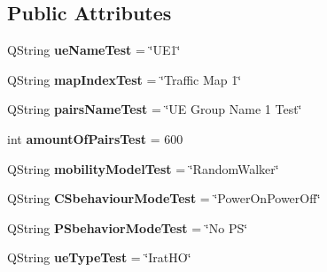 \subsection*{Public Attributes}
\begin{DoxyCompactItemize}
\item 
Q\+String {\bfseries ue\+Name\+Test} = \char`\"{}U\+E1\char`\"{}\hypertarget{class_u_egroup_data___test_ac276af52c4a08459dc2b8c28e0e79672}{}\label{class_u_egroup_data___test_ac276af52c4a08459dc2b8c28e0e79672}

\item 
Q\+String {\bfseries map\+Index\+Test} = \char`\"{}Traffic Map 1\char`\"{}\hypertarget{class_u_egroup_data___test_acc29f4359d9554b43cd0bce6b0a38901}{}\label{class_u_egroup_data___test_acc29f4359d9554b43cd0bce6b0a38901}

\item 
Q\+String {\bfseries pairs\+Name\+Test} = \char`\"{}UE Group Name 1 Test\char`\"{}\hypertarget{class_u_egroup_data___test_a37b1cd389126c5254b4b9e699be8ca86}{}\label{class_u_egroup_data___test_a37b1cd389126c5254b4b9e699be8ca86}

\item 
int {\bfseries amount\+Of\+Pairs\+Test} = 600\hypertarget{class_u_egroup_data___test_a21361becc56b09b177c8cf5ff15b7173}{}\label{class_u_egroup_data___test_a21361becc56b09b177c8cf5ff15b7173}

\item 
Q\+String {\bfseries mobility\+Model\+Test} = \char`\"{}Random\+Walker\char`\"{}\hypertarget{class_u_egroup_data___test_aaae3fba963929853c94c834fda1e390a}{}\label{class_u_egroup_data___test_aaae3fba963929853c94c834fda1e390a}

\item 
Q\+String {\bfseries C\+Sbehaviour\+Mode\+Test} = \char`\"{}Power\+On\+Power\+Off\char`\"{}\hypertarget{class_u_egroup_data___test_a2a784cf4b24971b948459192b6f143dc}{}\label{class_u_egroup_data___test_a2a784cf4b24971b948459192b6f143dc}

\item 
Q\+String {\bfseries P\+Sbehavior\+Mode\+Test} = \char`\"{}No PS\char`\"{}\hypertarget{class_u_egroup_data___test_aed4a87499827dbb90160554aafdc05e3}{}\label{class_u_egroup_data___test_aed4a87499827dbb90160554aafdc05e3}

\item 
Q\+String {\bfseries ue\+Type\+Test} = \char`\"{}Irat\+HO\char`\"{}\hypertarget{class_u_egroup_data___test_a03200ec484289afc7385505be2fa0f80}{}\label{class_u_egroup_data___test_a03200ec484289afc7385505be2fa0f80}


\end{DoxyCompactItemize}
